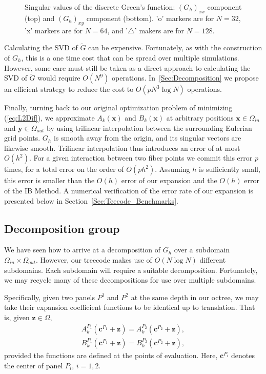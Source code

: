 \documentclass[preprint,12pt]{elsarticle}
\newcommand{\B}[1]{\mathbf{#1}}
\newcommand{\ti}[1]{\tilde{#1}}
\newcommand{\Panel}[1]{#1}
\begin{document}
\begin{figure}[htb]
\begin{center}
	\end{center}	
	\caption{Singular values of the discrete Green's function: $\left(G_h\right)_{xx}$ component (top) and $\left(G_h\right)_{xy}$ component (bottom). 'o' markers are for $N=32$, 'x' markers are for $N=64$, and '$\triangle$' makers are for $N=128$.}
	\label{fig:svalues_00}
\end{figure}

Calculating the SVD of $\ti{G}$ can be expensive. Fortunately, as with the construction of $G_h$, this is a one time cost that can be spread over multiple simulations. However, some care must still be taken as a direct approach to calculating the SVD of $\ti{G}$ would require $O(N^9)$ operations. In~\ref{Sec:Decomposition} we propose an 
efficient strategy to reduce the cost to $O(pN^3\log N)$ operations.

Finally, turning back to our original optimization problem of minimizing (\ref{eq:L2Dif}), we approximate $A_k(\B{x})$ and $B_k(\B{x})$ at arbitrary positions $\B{x}\in\Omega_{in}$ and $\B{y}\in\Omega_{out}$ by using trilinear interpolation between the surrounding Eulerian grid points. $G_h$ is smooth away from the origin, and its singular vectors are likewise smooth. Trilinear interpolation thus introduces an error of at most $O(h^2)$. For a given interaction between two fiber points we commit this error $p$ times, for a total error on the order of $O(ph^2)$. Assuming $h$ is sufficiently small, this error is smaller than the $O(h)$ error of our expansion and the $O(h)$ error of the IB Method. A numerical verification of the error rate of our expansion is presented below in Section~\ref{Sec:Teecode_Benchmarks}.
\subsection{Decomposition group}
We have seen how to arrive at a decomposition of $G_h$ over a subdomain $\Omega_{in}\times\Omega_{out}$. However, our treecode makes use of $O(N \log N)$ different subdomains. Each subdomain will require a suitable decomposition. Fortunately, we may recycle many of these decompositions for use over multiple subdomains.

Specifically, given two panels $\Panel{P}^1$ and $\Panel{P}^2$ at the same depth in our octree, we may take their expansion coefficient functions to be identical up to translation. That is, given $\B{z}\in\Omega$,
\begin{gather}
A_k^{P_1}(\B{c}^{P_1}+\B{z}) = A_k^{P_2}(\B{c}^{P_2}+\B{z}), \\
B_k^{P_1}(\B{c}^{P_1}+\B{z}) = B_k^{P_2}(\B{c}^{P_2}+\B{z}),
\end{gather}
provided the functions are defined at the points of evaluation. Here, $\B{c}^{P_i}$ denotes the center of panel $P_i$, $i=1,2$.
\end{document}
